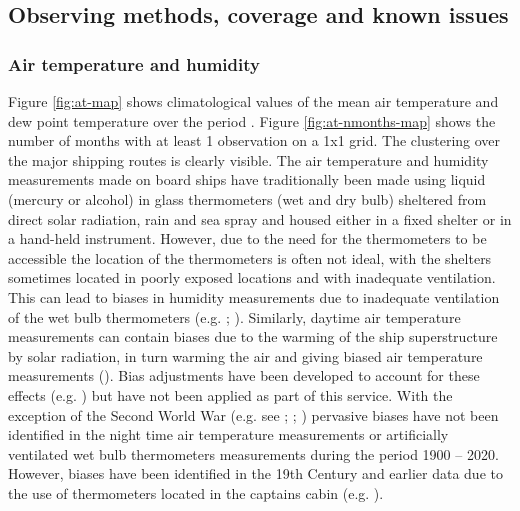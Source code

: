 \subsection{Observing methods, coverage and known issues}
\subsubsection{Air temperature and humidity}
Figure \ref{fig:at-map} shows climatological values of the mean air temperature and dew point temperature over the period \datatimerange{}. 
Figure \ref{fig:at-nmonths-map} shows the number of months with at least 1 observation on a 1x1 grid. 
The clustering over the major shipping routes is clearly visible.
The air temperature and humidity measurements made on board ships have traditionally been made using liquid (mercury or alcohol) in glass thermometers (wet and dry bulb) sheltered from direct solar radiation, rain and sea spray and housed either in a fixed shelter or in a hand-held instrument. 
However, due to the need for the thermometers to be accessible the location of the thermometers is often not ideal, with the shelters sometimes located in poorly exposed locations and with inadequate ventilation.
This can lead to biases in humidity measurements due to inadequate ventilation of the wet bulb thermometers (e.g. \cite{Berry2011}; \cite{Willett2008}). 
Similarly, daytime air temperature measurements can contain biases due to the warming of the ship superstructure by solar radiation, in turn warming the air and giving biased air temperature measurements (\cite{Rayner2003}). 
Bias adjustments have been developed to account for these effects (e.g. \cite{Berry2004}) but have not been applied as part of this service. 
With the exception of the Second World War (e.g. see \cite{Cornes2020}; \cite{Kent2013NMAT}; \cite{Rayner2003}) pervasive biases have not been identified in the night time air temperature measurements or artificially ventilated wet bulb thermometers measurements during the period 1900 – 2020.
However, biases have been identified in the 19th Century and earlier data due to the use of thermometers located in the captains cabin (e.g. \cite{Chenoweth2000}).

